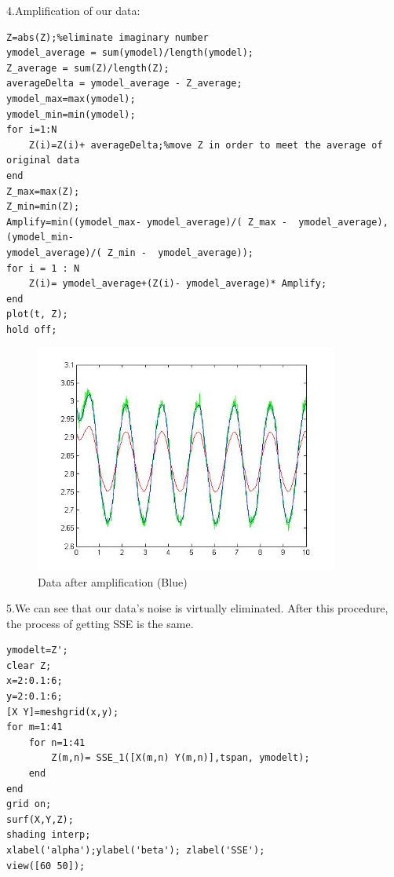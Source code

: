 \documentclass[a4paper]{article}
\begin{document}
4.Amplification of our data:
\begin{verbatim}
Z=abs(Z);%eliminate imaginary number
ymodel_average = sum(ymodel)/length(ymodel);
Z_average = sum(Z)/length(Z);
averageDelta = ymodel_average - Z_average;
ymodel_max=max(ymodel);
ymodel_min=min(ymodel);
for i=1:N
    Z(i)=Z(i)+ averageDelta;%move Z in order to meet the average of original data
end
Z_max=max(Z);
Z_min=min(Z);
Amplify=min((ymodel_max- ymodel_average)/( Z_max -  ymodel_average), (ymodel_min-
ymodel_average)/( Z_min -  ymodel_average));
for i = 1 : N
    Z(i)= ymodel_average+(Z(i)- ymodel_average)* Amplify;
end
plot(t, Z);
hold off;
\end{verbatim}

\begin{figure}[!htb]
\centering
\includegraphics[width=10cm]{4-6.jpg}
\caption{Data after amplification (Blue)}
\label{4-6}
\end{figure}

5.We can see that our data’s noise is virtually eliminated. After this procedure, the process of getting SSE is the same.
\begin{verbatim}
ymodelt=Z';
clear Z;
x=2:0.1:6;
y=2:0.1:6;
[X Y]=meshgrid(x,y);
for m=1:41
    for n=1:41
        Z(m,n)= SSE_1([X(m,n) Y(m,n)],tspan, ymodelt);
    end
end
grid on;
surf(X,Y,Z);
shading interp;
xlabel('alpha');ylabel('beta'); zlabel('SSE');
view([60 50]);
\end{verbatim}
\end{document}
